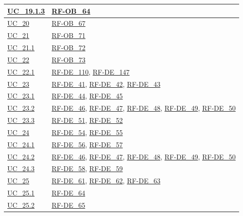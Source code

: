 \begin{longtable}{|
        >{\raggedright\arraybackslash}p{} |
        >{\raggedright\arraybackslash}p{} |
    }
    \hline
    \hyperref[uc_19.1.3]{UC\_19.1.3} & \hyperlink{rf-ob_64}{RF-OB\_64} \\
    \hline
    \hyperref[uc_20]{UC\_20} & \hyperlink{rf-ob_67}{RF-OB\_67} \\
    \hline
    \hyperref[uc_21]{UC\_21} & \hyperlink{rf-ob_71}{RF-OB\_71} \\
    \hline
    \hyperref[uc_21.1]{UC\_21.1} & \hyperlink{rf-ob_72}{RF-OB\_72} \\
    \hline
    \hyperref[uc_22]{UC\_22} & \hyperlink{rf-ob_73}{RF-OB\_73} \\
    \hline
    \hyperref[uc_22.1]{UC\_22.1} & \hyperlink{rf-de_110}{RF-DE\_110}, \hyperlink{rf-de_147}{RF-DE\_147} \\
    \hline
    \hyperref[uc_23]{UC\_23} & \hyperlink{rf-de_41}{RF-DE\_41}, \hyperlink{rf-de_42}{RF-DE\_42}, \hyperlink{rf-de_43}{RF-DE\_43} \\
    \hline
    \hyperref[uc_23.1]{UC\_23.1} & \hyperlink{rf-de_44}{RF-DE\_44}, \hyperlink{rf-de_45}{RF-DE\_45} \\
    \hline
    \hyperref[uc_23.2]{UC\_23.2} & \hyperlink{rf-de_46}{RF-DE\_46}, \hyperlink{rf-de_47}{RF-DE\_47}, \hyperlink{rf-de_48}{RF-DE\_48}, \hyperlink{rf-de_49}{RF-DE\_49}, \hyperlink{rf-de_50}{RF-DE\_50} \\
    \hline
    \hyperref[uc_23.3]{UC\_23.3} & \hyperlink{rf-de_51}{RF-DE\_51}, \hyperlink{rf-de_52}{RF-DE\_52} \\
    \hline
    \hyperref[uc_24]{UC\_24} & \hyperlink{rf-de_54}{RF-DE\_54}, \hyperlink{rf-de_55}{RF-DE\_55} \\
    \hline
    \hyperref[uc_24.1]{UC\_24.1} & \hyperlink{rf-de_56}{RF-DE\_56}, \hyperlink{rf-de_57}{RF-DE\_57} \\
    \hline
    \hyperref[uc_24.2]{UC\_24.2} & \hyperlink{rf-de_46}{RF-DE\_46}, \hyperlink{rf-de_47}{RF-DE\_47}, \hyperlink{rf-de_48}{RF-DE\_48}, \hyperlink{rf-de_49}{RF-DE\_49}, \hyperlink{rf-de_50}{RF-DE\_50} \\
    \hline
    \hyperref[uc_24.3]{UC\_24.3} & \hyperlink{rf-de_58}{RF-DE\_58}, \hyperlink{rf-de_59}{RF-DE\_59} \\
    \hline
    \hyperref[uc_25]{UC\_25} & \hyperlink{rf-de_61}{RF-DE\_61}, \hyperlink{rf-de_62}{RF-DE\_62}, \hyperlink{rf-de_63}{RF-DE\_63} \\
    \hline
    \hyperref[uc_25.1]{UC\_25.1} & \hyperlink{rf-de_64}{RF-DE\_64} \\
    \hline
    \hyperref[uc_25.2]{UC\_25.2} & \hyperlink{rf-de_65}{RF-DE\_65} \\

\end{longtable}
